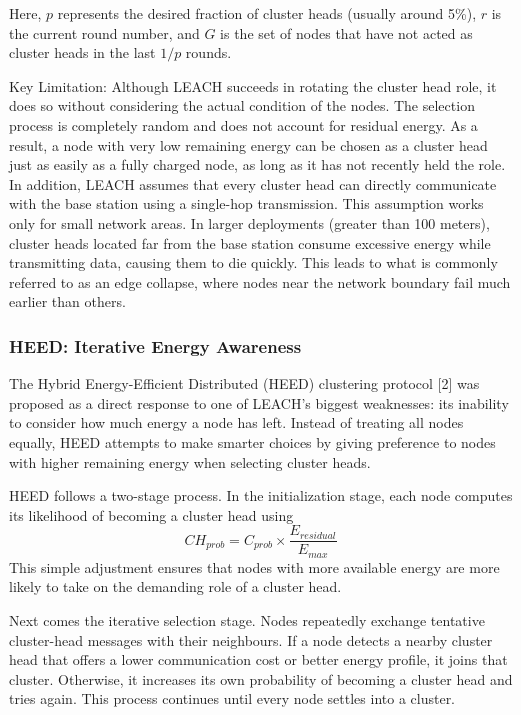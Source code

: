 \documentclass[conference]{IEEEtran}
\begin{document}
Here, $p$ represents the desired fraction of cluster heads (usually around 5\%), $r$ is the current round number, and $G$ is the set of nodes that have not acted as cluster heads in the last $1/p$ rounds.

Key Limitation:
Although LEACH succeeds in rotating the cluster head role, it does so without considering the actual condition of the nodes. The selection process is completely random and does not account for residual energy. As a result, a node with very low remaining energy can be chosen as a cluster head just as easily as a fully charged node, as long as it has not recently held the role.
In addition, LEACH assumes that every cluster head can directly communicate with the base station using a single-hop transmission. This assumption works only for small network areas. In larger deployments (greater than 100 meters), cluster heads located far from the base station consume excessive energy while transmitting data, causing them to die quickly. This leads to what is commonly referred to as an edge collapse, where nodes near the network boundary fail much earlier than others.

\subsubsection{HEED: Iterative Energy Awareness}
The Hybrid Energy-Efficient Distributed (HEED) clustering protocol [2] was proposed as a direct response to one of LEACH’s biggest weaknesses: its inability to consider how much energy a node has left. Instead of treating all nodes equally, HEED attempts to make smarter choices by giving preference to nodes with higher remaining energy when selecting cluster heads.

HEED follows a two-stage process.
In the initialization stage, each node computes its likelihood of becoming a cluster head using
\begin{equation}
CH_{prob} = C_{prob} \times \frac{E_{residual}}{E_{max}}
\end{equation}
This simple adjustment ensures that nodes with more available energy are more likely to take on the demanding role of a cluster head.

Next comes the iterative selection stage. Nodes repeatedly exchange tentative cluster-head messages with their neighbours. If a node detects a nearby cluster head that offers a lower communication cost or better energy profile, it joins that cluster. Otherwise, it increases its own probability of becoming a cluster head and tries again. This process continues until every node settles into a cluster.
\end{document}
